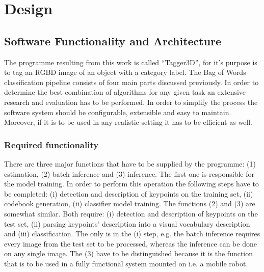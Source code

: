 \chapter{Design}

\section{Software Functionality and Architecture}
	The programme resulting from this work is called ``Tagger3D'', for it's purpose is to tag an RGBD image of an object with a category label. The Bag of Words classification pipeline consists of four main parts discussed previously. In order to determine the best combination of algorithms for any given task an extensive research and evaluation has to be performed. In order to simplify the process the software system should be configurable, extensible and easy to maintain. Moreover, if it is to be used in any realistic setting it has to be efficient as well.
	
	\subsection{Required functionality}	
	There are three major functions that have to be supplied by the programme: (1) estimation, (2) batch inference and (3) inference. The first one is responsible for the model training. In order to perform this operation the following steps have to be completed: (i) detection and description of keypoints on the training set, (ii) codebook generation, (ii) classifier model training. The functions (2) and (3) are somewhat similar. Both require: (i) detection and description of keypoints on the test set, (ii) parsing keypoints' description into a visual vocabulary description and (iii) classification. The only is in the (i) step, e.g. the batch inference requires every image from the test set to be processed, whereas the inference can be done on any single image. The (3) have to be distinguished because it is the function that is to be used in a fully functional system mounted on i.e. a mobile robot.
	

